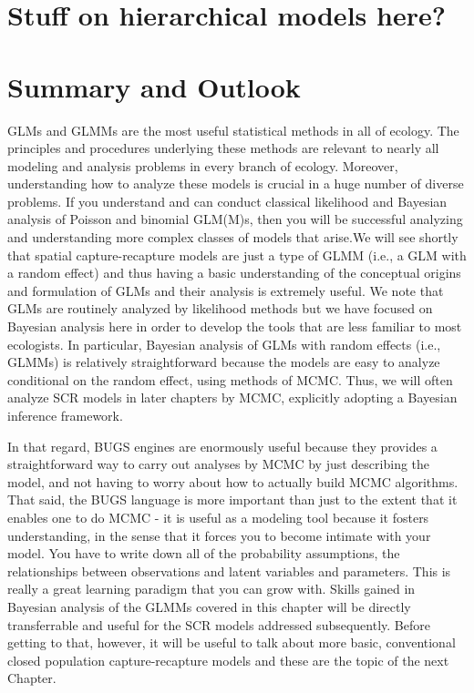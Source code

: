 \section{Stuff on hierarchical models here?}

\section{ Summary and Outlook}


GLMs and GLMMs are the most useful statistical methods in all of ecology. The principles and procedures underlying these methods are relevant to nearly all modeling and analysis problems in every branch of ecology. Moreover, understanding how to analyze these models is crucial in a huge number of diverse problems. If you understand and can conduct classical likelihood and Bayesian analysis of Poisson and binomial GLM(M)s, then you will be successful analyzing and understanding more complex classes of models that arise.We will see shortly that spatial capture-recapture models are just a type of GLMM (i.e., a GLM with a random effect) and thus having a basic understanding of the conceptual origins and formulation of GLMs and their analysis is extremely useful. We note that GLMs are routinely analyzed by likelihood methods but we have focused on Bayesian analysis here in order to develop the tools that are less familiar to most ecologists.  In particular, Bayesian analysis of GLMs with random effects (i.e., GLMMs) is relatively straightforward because the models are easy to analyze conditional on the random effect, using methods of MCMC.  Thus, we will often analyze SCR models in later chapters by MCMC, explicitly adopting a Bayesian inference framework.

In that regard, BUGS engines are enormously useful because they provides a straightforward way to carry out analyses by MCMC by just describing the model, and not having to worry about how to actually build MCMC algorithms.  That said, the BUGS language is more important than just to the extent that it enables one to do MCMC - it is useful as a modeling tool because it fosters understanding, in the sense that it forces you to become intimate with your model. You have to write down all of the probability assumptions, the relationships between observations and latent variables and parameters. This is really a great learning paradigm that you can grow with. Skills gained in Bayesian analysis of the GLMMs covered in this chapter will be directly transferrable and useful for the SCR models addressed subsequently. Before getting to that, however, it will be useful to talk about more basic, conventional closed population capture-recapture models and these are the topic of the next Chapter. 
